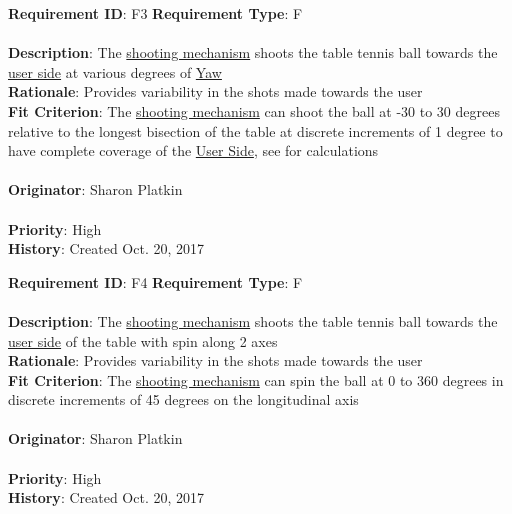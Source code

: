 \documentclass[11pt]{article}
\begin{document}
\begin{framed}
	\noindent\textbf{Requirement ID}: F3 \hfill \textbf{Requirement Type}: F \hfill\\\\
	\noindent\textbf{Description}: The \hyperref[sec:definitions]{shooting mechanism} shoots the table tennis ball towards the \hyperref[sec:definitions]{user side} at various degrees of \hyperref[sec:definitions]{Yaw} \\
	\textbf{Rationale}: Provides variability in the shots made towards the user \\
	\textbf{Fit Criterion}: The \hyperref[sec:definitions]{shooting mechanism} can shoot the ball at -30 to 30 degrees relative to the longest bisection of the table at discrete increments of 1 degree to have complete coverage of the \hyperref[sec:definitions]{User Side}, see  for calculations \\\\
	\textbf{Originator}: Sharon Platkin \\\\
	\textbf{Priority}: High \hfill \\
	\noindent\textbf{History}: Created Oct. 20, 2017
\end{framed}

\begin{framed}
	\noindent\textbf{Requirement ID}: F4 \hfill \textbf{Requirement Type}: F \hfill\\\\
	\noindent\textbf{Description}: The \hyperref[sec:definitions]{shooting mechanism} shoots the table tennis ball towards the \hyperref[sec:definitions]{user side} of the table with spin along 2 axes \\
	\textbf{Rationale}: Provides variability in the shots made towards the user \\
	\textbf{Fit Criterion}: The \hyperref[sec:definitions]{shooting mechanism} can spin the ball at 0 to 360 degrees in discrete increments of 45 degrees on the longitudinal axis\\\\ %
	\textbf{Originator}: Sharon Platkin \\\\
	\textbf{Priority}: High \hfill \\
	\noindent\textbf{History}: Created Oct. 20, 2017
\end{framed}
\end{document}

